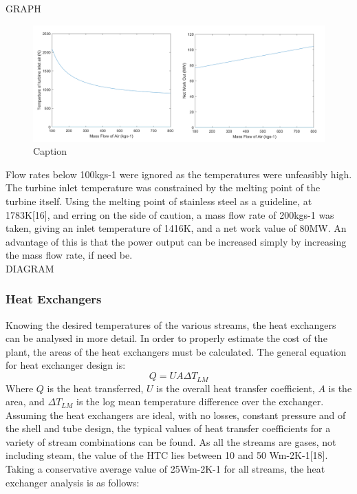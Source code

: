 GRAPH
\begin{figure}[h!]
    \centering
    \includegraphics[scale=0.6]{t3_and_nw_vs_mass_flow_final.png}
    \caption{Caption}
    \label{fig:my_label}
\end{figure}

Flow rates below 100kgs-1 were ignored as the temperatures were unfeasibly high. The turbine inlet temperature was constrained by the melting point of the turbine itself. Using the melting point of stainless steel as a guideline, at 1783K[16], and erring on the side of caution, a mass flow rate of 200kgs-1 was taken, giving an inlet temperature of 1416K, and a net work value of 80MW. An advantage of this is that the power output can be increased simply by increasing the mass flow rate, if need be.
\\
DIAGRAM
\\

    \subsubsection{Heat Exchangers}
    
    Knowing the desired temperatures of the various streams, the heat exchangers can be analysed in more detail. In order to properly estimate the cost of the plant, the areas of the heat exchangers must be calculated. The general equation for heat exchanger design is:
\begin{equation}
Q=UA\Delta T_{LM}						
\end{equation}
Where $Q$ is the heat transferred, $U$ is the overall heat transfer coefficient, $A$ is the area, and $\Delta T_{LM}$ is the log mean temperature difference over the exchanger. Assuming the heat exchangers are ideal, with no losses, constant pressure and of the shell and tube design, the typical values of heat transfer coefficients for a variety of stream combinations can be found. As all the streams are gases, not including steam, the value of the HTC lies between 10 and 50 Wm-2K-1[18]. Taking a conservative average value of 25Wm-2K-1 for all streams, the heat exchanger analysis is as follows:


